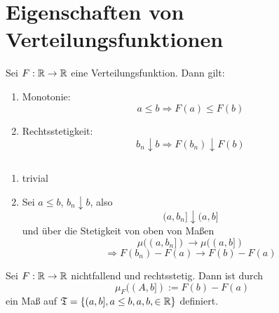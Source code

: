 		\section{Eigenschaften von Verteilungsfunktionen}
			\begin{satz}
				Sei $F:\mathbb{R}\to\mathbb{R}$ eine Verteilungsfunktion. Dann gilt:
				\begin{enumerate}
					\item Monotonie:
					\[ a\le b\Rightarrow F(a)\le F(b) \]
					\item Rechtsstetigkeit:
					\[ b_n\downarrow b\Rightarrow F(b_n)\downarrow F(b) \]
				\end{enumerate}
			\end{satz}
			
			\begin{bew} $\text{  }$ %
				
				\begin{enumerate}
					\item trivial
					\item Sei $a\le b$, $b_n\downarrow b$, also
					\[ (a,b_n]\downarrow (a,b] \]
					und über die Stetigkeit von oben von Maßen
					\[ \mu((a,b_n])\to \mu((a,b]) \]
					\[ \Rightarrow F(b_n)-F(a)\to F(b)-F(a) \]
				\end{enumerate}
			\end{bew}
			
			\begin{satz}
				Sei $F:\mathbb{R}\to\mathbb{R}$ nichtfallend und rechtsstetig. Dann ist durch 
				\[ \mu_F((A,b]):=F(b)-F(a) \]
				ein Maß auf $\mathfrak{T}=\{(a,b], a\le b, a,b,\in\mathbb{R}\}$ definiert.
			\end{satz}
			
